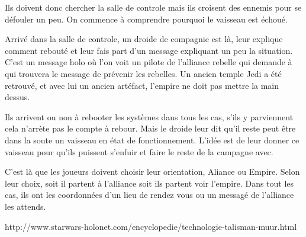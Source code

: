 \documentclass{jdrp}
\begin{document}
Ils doivent donc chercher la salle de controle mais ils croisent des ennemis pour se défouler un peu. On commence à comprendre pourquoi le vaisseau est échoué.

Arrivé dans la salle de controle, un droide de compagnie est là, leur explique comment rebouté et leur fais part d'un message expliquant un peu la situation. C'est un message holo où l'on voit un pilote de l'alliance rebelle qui demande à qui trouvera le message de prévenir les rebelles. Un ancien temple Jedi a été retrouvé, et avec lui un ancien artéfact, l'empire ne doit pas mettre la main dessus.

Ils arrivent ou non à rebooter les systèmes dans tous les cas, s'ils y parviennent cela n'arrète pas le compte à rebour. Mais le droide leur dit qu'il reste peut être dans la soute un vaisseau en état de fonctionnement. L'idée est de leur donner ce vaisseau pour qu'ils puissent s'enfuir et faire le reste de la campagne avec.

C'est là que les joueurs doivent choisir leur orientation, Aliance ou Empire. Selon leur choix, soit il partent à l'alliance soit ils partent voir l'empire. Dans tout les cas, ils ont les coordonnées d'un lieu de rendez vous ou un messagé de l'alliance les attends.

http://www.starwars-holonet.com/encyclopedie/technologie-talisman-muur.html

	\onecolumn
	\nocite{*}
	\printbibliography
\end{document}
